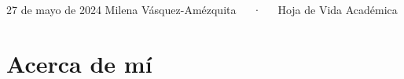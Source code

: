 \documentclass[11pt,a4paper,]{awesome-cv}
\begin{document}
\makecvheader

\makecvfooter
  {27 de mayo de 2024}
    {Milena Vásquez-Amézquita~~~·~~~Hoja de Vida Académica}
  {\thepage}





\section{Acerca de mí}\label{acerca-de-muxed}
\end{document}

